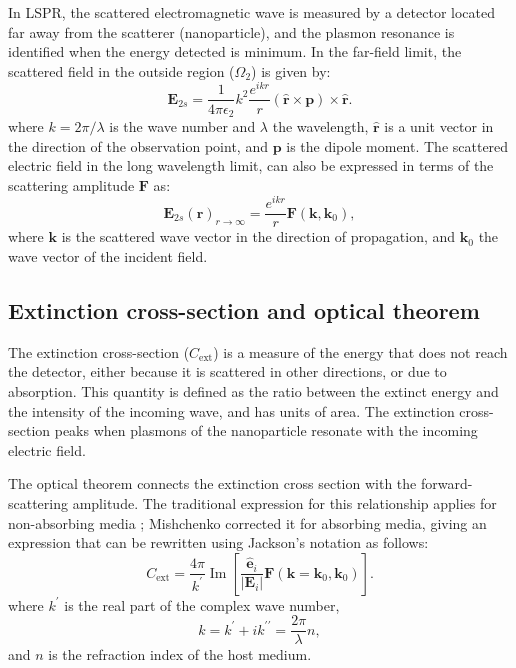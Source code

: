 In LSPR, the scattered electromagnetic wave is measured by a detector located far away 
from the scatterer (nanoparticle), and the plasmon resonance is identified when the energy 
detected is minimum. In the far-field limit, the scattered field
in the outside region ($\Omega_2$) is given by: 
%
\begin{equation} \label{eq:scat_efield_long_range}
    \mathbf{E}_{2s} = \frac{1}{4\pi\epsilon_2}k^2\frac{e^{ikr}}{r} (\mathbf{\hat{r}} \times \mathbf{p})\times\mathbf{\hat{r}}.
\end{equation} 
%
where $k=2\pi/\lambda$ is the wave number and $\lambda$ the wavelength, $\mathbf{\hat{r}}$ 
is a unit vector in the direction of the observation point, and $\mathbf{p}$ is
the dipole moment. 
The scattered electric field in the long wavelength limit, can also be expressed in terms of the 
scattering amplitude $\mathbf{F}$ \cite{Jackson} as:
%
\begin{equation} \label{eq:scat_efield_fwa}
    \mathbf{E}_{2s}(\mathbf{r})_{r\to\infty} = \frac{e^{ikr}}{r} \mathbf{F}(\mathbf{k},\mathbf{k}_0),
\end{equation}
%
where $\mathbf{k}$ is the scattered wave vector in the direction of propagation, and $\mathbf{k}_0$ the 
wave vector of the incident field. 

\subsection{Extinction cross-section and optical theorem} \label{sec:cext_ot}

The extinction cross-section ($C_\text{ext}$) is a measure of the energy that 
does not reach the detector, either because it is scattered in other directions,
or due to absorption. This quantity is defined as the ratio between the extinct energy and 
the intensity of the incoming wave, and has units of area. The extinction cross-section peaks when
plasmons of the nanoparticle resonate with the incoming electric field.

The optical theorem connects the extinction cross section with the forward-scattering amplitude. The traditional 
expression for this relationship applies for non-absorbing media 
\cite{MayergoyzZhang2007, Jackson}; Mishchenko \cite{Mishchenko2007} corrected it for absorbing media, 
giving an expression that can be rewritten using Jackson's notation \cite{Jackson} as follows:
%
\begin{equation} \label{eq:cext_fwa}
    C_\text{ext} = \frac{4\pi}{k^\prime} \operatorname{Im} \left[ \frac{\mathbf{\hat{e}}_i}{|\mathbf{E}_i|}\mathbf{F}(\mathbf{k}=\mathbf{k}_0, \mathbf{k}_0) \right].
\end{equation}
%
where $k^\prime$ is the real part of the complex wave number, 
%
\begin{equation}
    k = k^\prime + ik^{\prime\prime} = \frac{2\pi}{\lambda} n,
\end{equation}
%
and $n$ is the refraction index of the host medium.

